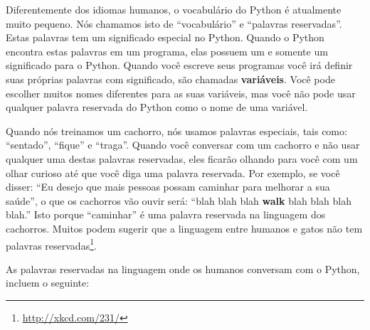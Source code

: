 Diferentemente dos idiomas humanos, o vocabulário do Python é atualmente muito pequeno.
Nós chamamos isto de ``vocabulário'' e ``palavras reservadas''. Estas palavras tem
um significado especial no Python. Quando o Python encontra estas palavras em um
programa, elas possuem um e somente um significado para o Python. Quando você
escreve seus programas você irá definir suas próprias palavras com significado,
são chamadas {\bf variáveis}. Você pode escolher muitos nomes diferentes para
as suas variáveis, mas você não pode usar qualquer palavra reservada do Python
como o nome de uma variável.
%

Quando nós treinamos um cachorro, nós usamos palavras especiais, tais como:
``sentado'', ``fique'' e ``traga''. Quando você conversar com um cachorro e
não usar qualquer uma destas palavras reservadas, eles ficarão olhando para você
com um olhar curioso até que você diga uma palavra reservada.
Por exemplo, se você disser: ``Eu desejo que mais pessoas possam caminhar para
melhorar a sua saúde'', o que os cachorros vão ouvir será:
``blah blah blah {\bf walk} blah blah blah blah.''
Isto porque ``caminhar'' é uma palavra reservada na linguagem dos cachorros. Muitos
podem sugerir que a linguagem entre humanos e gatos não tem palavras 
reservadas\footnote{\url{http://xkcd.com/231/}}.
%

As palavras reservadas na linguagem onde os humanos conversam com o
Python, incluem o seguinte:
%

